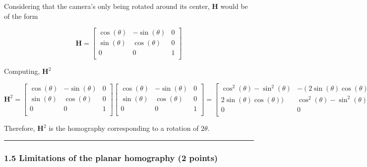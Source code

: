 \documentclass[11pt]{article}
\begin{document}
Considering that the camera's only being rotated around its center,
\(\mathbf{H}\) would be of the form

\[ \mathbf{H} =
\begin{bmatrix}
\cos(\theta) & -\sin(\theta) & 0\\
\sin(\theta) & \cos(\theta) & 0\\
0 & 0 & 1\\
\end{bmatrix} \]

Computing, \(\mathbf{H}^2\)

\[ \mathbf{H}^2 =
\begin{bmatrix}
\cos(\theta) & -\sin(\theta) & 0\\
\sin(\theta) & \cos(\theta) & 0\\
0 & 0 & 1\\
\end{bmatrix}\begin{bmatrix}
\cos(\theta) & -\sin(\theta) & 0\\
\sin(\theta) & \cos(\theta) & 0\\
0 & 0 & 1\\
\end{bmatrix} = \begin{bmatrix}
\cos^2(\theta) - \sin^2(\theta) & -(2\sin(\theta)\cos(\theta)) & 0\\
2\sin(\theta)\cos(\theta)) & \cos^2(\theta) - \sin^2(\theta) & 0\\
0 & 0 & 1\\
\end{bmatrix} = \begin{bmatrix}
\cos(2\theta) & -\sin(2\theta) & 0\\
\sin(2\theta) & \cos(2\theta) & 0\\
0 & 0 & 1\\
\end{bmatrix} \]

Therefore, \(\mathbf{H}^2\) is the homography corresponding to a
rotation of \(2\theta\).

\begin{center}\rule{0.5\linewidth}{0.5pt}\end{center}

    \hypertarget{limitations-of-the-planar-homography-2-points}{%
\subsubsection{1.5 Limitations of the planar homography (2
points)}\label{limitations-of-the-planar-homography-2-points}}
\end{document}
